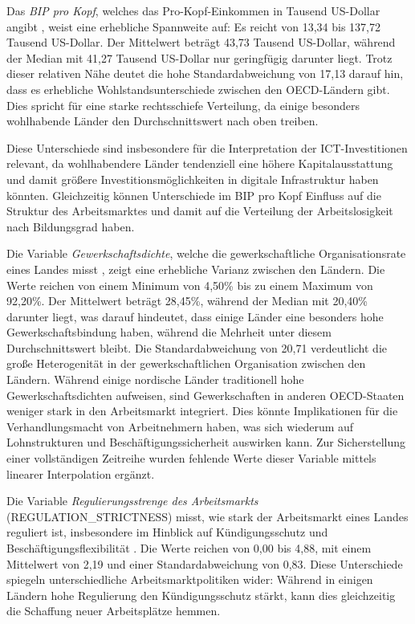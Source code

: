 Das \textit{\ac{BIP} pro Kopf}, welches das Pro-Kopf-Einkommen in Tausend US-Dollar angibt 
\parencite{oecd2022gdp}, weist eine erhebliche Spannweite auf: Es reicht von 13,34 bis 
137,72 Tausend US-Dollar. Der Mittelwert beträgt 43,73 Tausend US-Dollar, während der 
Median mit 41,27 Tausend US-Dollar nur geringfügig darunter liegt. Trotz dieser relativen 
Nähe deutet die hohe Standardabweichung von 17,13 darauf hin, dass es erhebliche 
Wohlstandsunterschiede zwischen den \ac{OECD}-Ländern gibt. Dies spricht für eine starke 
rechtsschiefe Verteilung, da einige besonders wohlhabende Länder den Durchschnittswert 
nach oben treiben.

Diese Unterschiede sind insbesondere für die Interpretation der \ac{ICT}-Investitionen 
relevant, da wohlhabendere Länder tendenziell eine höhere Kapitalausstattung und damit 
größere Investitionsmöglichkeiten in digitale Infrastruktur haben könnten. Gleichzeitig 
können Unterschiede im \ac{BIP} pro Kopf Einfluss auf die Struktur des Arbeitsmarktes und 
damit auf die Verteilung der Arbeitslosigkeit nach Bildungsgrad haben.

Die Variable \textit{Gewerkschaftsdichte}, welche die gewerkschaftliche Organisationsrate 
eines Landes misst \parencite{oecd2022tud}, zeigt eine erhebliche Varianz zwischen den 
Ländern. Die Werte reichen von einem Minimum von 4,50\% bis zu einem Maximum von 92,20\%. 
Der Mittelwert beträgt 28,45\%, während der Median mit 20,40\% darunter liegt, was darauf 
hindeutet, dass einige Länder eine besonders hohe Gewerkschaftsbindung haben, während die 
Mehrheit unter diesem Durchschnittswert bleibt. Die Standardabweichung von 20,71 
verdeutlicht die große Heterogenität in der gewerkschaftlichen Organisation zwischen den 
Ländern. Während einige nordische Länder traditionell hohe Gewerkschaftsdichten aufweisen, 
sind Gewerkschaften in anderen \ac{OECD}-Staaten weniger stark in den Arbeitsmarkt 
integriert. Dies könnte Implikationen für die Verhandlungsmacht von Arbeitnehmern haben, 
was sich wiederum auf Lohnstrukturen und Beschäftigungssicherheit auswirken kann.  
Zur Sicherstellung einer vollständigen Zeitreihe wurden fehlende Werte dieser Variable 
mittels linearer Interpolation ergänzt.

Die Variable \textit{Regulierungsstrenge des Arbeitsmarkts} (REGULATION\_STRICTNESS) misst, 
wie stark der Arbeitsmarkt eines Landes reguliert ist, insbesondere im Hinblick auf 
Kündigungsschutz und Beschäftigungsflexibilität \parencite{oecd2022regulation}. Die Werte 
reichen von 0,00 bis 4,88, mit einem Mittelwert von 2,19 und einer Standardabweichung von 
0,83. Diese Unterschiede spiegeln unterschiedliche Arbeitsmarktpolitiken wider: Während in 
einigen Ländern hohe Regulierung den Kündigungsschutz stärkt, kann dies gleichzeitig die 
Schaffung neuer Arbeitsplätze hemmen.


